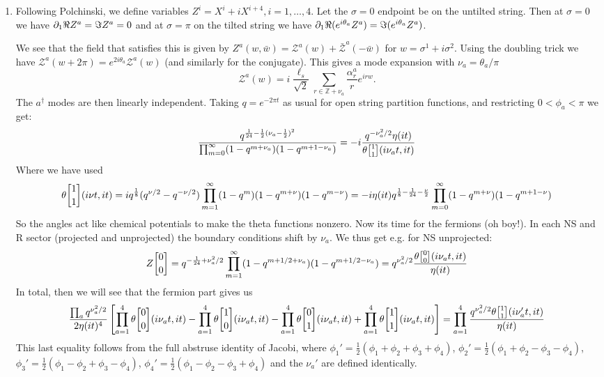 \documentclass[11pt, class=article, crop=false]{standalone}
\begin{document}
\begin{enumerate}
	\item Following Polchinski, we define variables $Z^i = X^i + i X^{i+4}, i= 1, \dots, 4$. Let the $\sigma = 0$ endpoint be on the untilted string. Then at $\sigma = 0$ we have $\partial_1 \Re Z^a = \Im Z^a = 0$ and at $\sigma = \pi$ on the tilted string we have $\partial_1 \Re(e^{i \theta_a} Z^a) = \Im(e^{i \theta_a} Z^a)$. 
	
	We see that the field that satisfies this is given by $Z^a(w, \bar w) = \mathcal Z^a(w) + \bar {\mathcal Z}^a (-\bar w)$ for $w = \sigma^1 + i \sigma^2$. Using the doubling trick we have $\mathcal Z^a(w + 2 \pi) = e^{2 i \theta_a} \mathcal Z^a(w)$ (and similarly for the conjugate). This gives a mode expansion with $\nu_a = \theta_a / \pi$
	\[
		\mathcal Z^a(w) = i \frac{\ell_s}{\sqrt 2} \sum_{r \in \mathbb Z + \nu_a} \frac{\alpha^a_r}{r} e^{i r w}.
	\]
	The $a^\dagger$ modes are then linearly independent. Taking $q = e^{-2\pi t}$ as usual for open string partition functions, and restricting $0 < \phi_a < \pi$ we get:
	\begin{equation*}
		\frac{q^{\frac1{24} - \frac12 (\nu_a - \frac12)^2}}{\prod_{m=0}^\infty (1 - q^{m + \nu_a}) (1 - q^{m + 1 - \nu_a})} = -i \frac{q^{- \nu_a^2/2}\eta(it)}{\theta\twist11 (i \nu_a t, i t)}
	\end{equation*}
	Where we have used 
	\[
		\theta\twist11 (i \nu t , it) = i q^{\frac{1}{8}} (q^{\nu/2} - q^{-\nu/2}) \prod_{m=1}^\infty (1-q^m) (1- q^{m+\nu}) (1- q^{m-\nu}) = -i  \eta(i t) q^{\frac18 - \frac{1}{24} - \frac{\nu}{2}} \prod_{m=0}^\infty (1- q^{m+\nu}) (1- q^{m+1-\nu})
	\]
	So the angles act like chemical potentials to make the theta functions nonzero. Now its time for the fermions (oh boy!). In each NS and R sector (projected and unprojected) the boundary conditions shift by $\nu_a$. We thus get e.g. for NS unprojected:
	\[
		Z\twist00 = q^{-\frac1{24} + \nu_a^2/2} \prod_{m=1}^\infty (1-q^{m+1/2 + \nu_a}) (1-q^{m + 1/2 - \nu_a}) = q^{\nu_a^2/2} \frac{\theta\twist00 (i \nu_a t , it)}{\eta(i t)}
	\]
	In total, then we will see that the fermion part gives us
	\[
		\frac{\prod_a q^{\nu_a^2/2}}{2 \eta(it)^4} \left[\prod_{a=1}^4 \theta\twist00 (i \nu_a t, it) - \prod_{a=1}^4 \theta\twist10 (i \nu_a t, it) - \prod_{a=1}^4 \theta\twist01 (i \nu_a t, it) + \prod_{a=1}^4 \theta\twist11 (i \nu_a t, it) \right]= \prod_{a=1}^4 \frac{q^{\nu_a^2/2}\theta\twist11 (i \nu_a' t, it)}{\eta(it)}
	\]
	This last equality follows from the full abstruse identity of Jacobi, where $\phi_1' = \frac12 (\phi_1 + \phi_2 + \phi_3 + \phi_4)$, $\phi_2' = \frac12 (\phi_1 + \phi_2 - \phi_3 - \phi_4)$, $\phi_3' = \frac12 (\phi_1 - \phi_2 + \phi_3 - \phi_4)$, $\phi_4' = \frac12 (\phi_1 - \phi_2 - \phi_3 + \phi_4)$ and the $\nu_a'$ are defined identically.

\end{enumerate}
\end{document}
